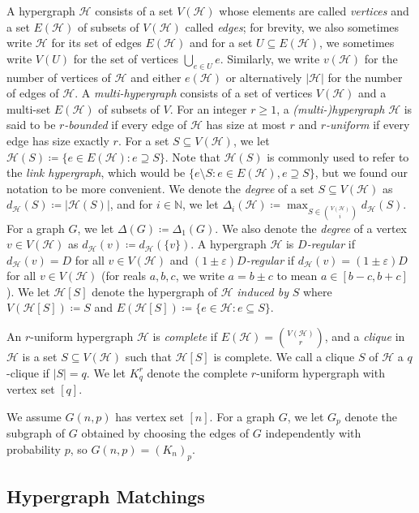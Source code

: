 \documentclass[11pt]{article}
\numberwithin{equation}{section}
\newcommand{\eps}{\varepsilon}
\newcounter{i}
\theoremstyle{plain}
\theoremstyle{plain} %
\theoremstyle{definition}
\newcommand{\cH}{\mathcal{H}}
\begin{document}
A hypergraph $\cH$  consists of a set $V(\cH)$ whose elements are called \textit{vertices} and a set $E(\cH)$ of subsets of $V(\cH)$ called \textit{edges}; for brevity, we also sometimes write $\cH$ for its set of edges $E(\cH)$ and for a set $U \subseteq E(\cH)$, we sometimes write $V(U)$ for the set of vertices $\bigcup_{e\in U}e$. Similarly, we write
$v(\cH)$ for the number of vertices of $\cH$ and either $e(\cH)$ or alternatively $|\cH|$ for the number of edges of $\cH$.
A \textit{multi-hypergraph} consists of a set of vertices $V(\cH)$ and a multi-set $E(\cH)$ of subsets of $V$. 
For an integer $r \geq 1$, a \textit{(multi-)hypergraph} $\cH$ is said to be \textit{$r$-bounded} if every edge of $\cH$ has size at most $r$ and \textit{$r$-uniform} if every edge has size exactly $r$.
For a set $S \subseteq V(\cH)$, we let $\cH(S) \coloneqq \{e \in E(\cH) : e \supseteq S\}$.  Note that $\cH(S)$ is commonly used to refer to the \textit{link hypergraph}, which would be $\{e \setminus S : e \in E(\cH), e \supseteq S\}$, but we found our notation to be more convenient.  
We denote the \textit{degree} of a set $S \subseteq V(\cH)$ as $d_\cH(S) \coloneqq |\cH(S)|$, and for $i \in \mathbb N$, we let $\Delta_i(\cH) \coloneqq \max_{S \in \binom{V(\cH)}{i}}d_\cH(S)$.
For a graph $G$, we let $\Delta(G) \coloneqq \Delta_1(G)$.
We also denote the \textit{degree} of a vertex $v \in V(\cH)$ as $d_\cH(v) \coloneqq d_\cH(\{v\})$.  A hypergraph $\cH$ is \textit{$D$-regular} if $d_\cH(v) = D$ for all $v \in V(\cH)$ and \textit{$(1 \pm \eps)D$-regular} if $d_\cH(v) = (1 \pm \eps)D$ for all $v \in V(\cH)$ (for reals $a,b,c$, we write $a = b\pm c$ to mean $a \in [b - c, b + c]$).
We let $\cH[S]$ denote the hypergraph of $\cH$ \textit{induced by} $S$ where $V(\cH[S]) \coloneqq S$ and $E(\cH[S]) \coloneqq \{e \in \cH : e \subseteq S\}$.


An $r$-uniform hypergraph $\cH$ is \textit{complete} if $E(\cH) = \binom{V(\cH)}{r}$, and a \textit{clique} in $\cH$ is a set $S \subseteq V(\cH)$ such that $\cH[S]$ is complete.  We call a clique $S$ of $\cH$ a $q$-clique if $|S| = q$.
We let $K^r_q$ denote the complete $r$-uniform hypergraph with vertex set $[q]$.  

We assume $G(n,p)$ has vertex set $[n]$.  For a graph $G$, we let $G_p$ denote the subgraph of $G$ obtained by choosing the edges of $G$ independently with probability $p$, so $G(n,p) = (K_n)_p$.

\subsection{Hypergraph Matchings}
\end{document}
